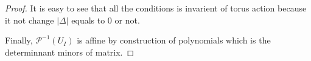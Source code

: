 \documentclass[10pt,UTF8]{article}
\theoremstyle{definition}
\renewcommand{\qed}{\rightline{$\qedsymbol$}}
\newtheorem*{proof}{Proof}
\begin{document}
\begin{proof}
It is easy to see that all the conditions is invarient of torus action because it not change $|\Delta|$ equals to $0$ or not.

Finally, $\mathscr{P}^{-1}(U_I)$ is affine by construction of polynomials which is the determinnant minors of matrix.

\qed
\end{proof}





\newpage 


\end{document}
